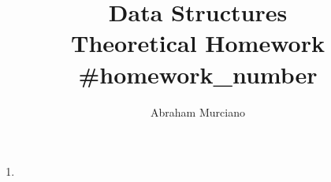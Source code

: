 \documentclass[fleqn]{article}
\title{Data Structures \\
\medskip
\large Theoretical Homework #{homework_number}}
\author{Abraham Murciano}
\newenvironment{answers}{ %
	\begin{enumerate}
		\setlength{\itemsep}{\bigskipamount}
}{\end{enumerate}}
\begin{document}
\maketitle

\begin{answers}

    \item

\end{answers}
\end{document}
